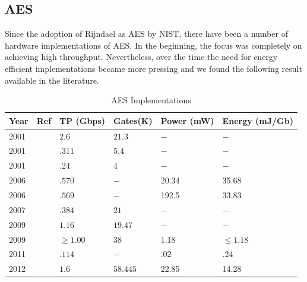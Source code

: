 \documentclass[lnicst,sechang,a4paper]{svmultln}
\begin{document}
\subsection{AES}
\label{sec:aes}
 Since the adoption of Rijndael as AES by NIST, there have been a number of hardware implementations of AES. In the beginning, the focus was completely on achieving high throughput. Nevertheless, over the time the need for energy efficient implementations became more pressing and we found the following result available in the literature. \newline


\begin{table}
\begin{center}
\begin{tabular}{|p{}
				|p{}
				|p{}
				|p{}
				|p{}
				|p{}|
				}
\hline
Year & Ref & TP (Gbps) & Gates(K) & Power (mW) & Energy (mJ/Gb) \\
\hline
2001 & \cite{IBM_Japan_2001} &$2.6$ &$21.3$  & $-$ & $-$ \\ \hline
2001 & \cite{IBM_Japan_2001} &$.311$ &$5.4$  & $-$ & $-$ \\ \hline
2001 & \cite{IBM_India_IIT_2001} &$.24$ &$4$  & $-$ & $-$ \\ \hline
2006 & \cite{Taiwan_2006} &$.570$ & $-$ &20.34 & 35.68 \\ \hline
2006 & \cite{Taiwan_2006} &$.569$ & $-$ &192.5 & 33.83 \\ \hline
2007 & \cite{IIT_Kharagpur_2007} &$.384$ &$21$ & $-$  & $-$ \\ \hline
2009 & \cite{IME_China_Tsinghua_Univerisity_2009} &$1.16$ &$19.47$ & $-$ & $-$ \\ \hline
2009 & \cite{Ruhr_2009} &$\geq 1.00$ &$38$ &1.18 & $\leq 1.18$ \\ \hline
2011 & \cite{Ruhr_2011} &$.114$ &$ - $ &.02 & .24 \\ \hline
2012 & \cite{Pune_2012} &$1.6$ &$58.445$ &22.85 & 14.28 \\ \hline
\end{tabular}
\end{center}
\caption{AES Implementations}
\label{table:aes_implementation}
\end{table}
\end{document}

